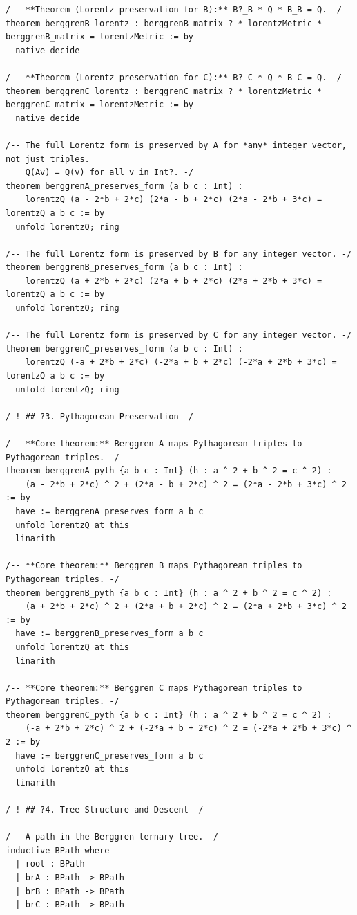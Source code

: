 \documentclass[11pt,twoside,openright]{book}
\theoremstyle{definition}
\theoremstyle{remark}
\begin{document}
\begin{lstlisting}[style=lean]
/-- **Theorem (Lorentz preservation for B):** B?_B * Q * B_B = Q. -/
theorem berggrenB_lorentz : berggrenB_matrix ? * lorentzMetric * berggrenB_matrix = lorentzMetric := by
  native_decide

/-- **Theorem (Lorentz preservation for C):** B?_C * Q * B_C = Q. -/
theorem berggrenC_lorentz : berggrenC_matrix ? * lorentzMetric * berggrenC_matrix = lorentzMetric := by
  native_decide

/-- The full Lorentz form is preserved by A for *any* integer vector, not just triples.
    Q(Av) = Q(v) for all v in Int?. -/
theorem berggrenA_preserves_form (a b c : Int) :
    lorentzQ (a - 2*b + 2*c) (2*a - b + 2*c) (2*a - 2*b + 3*c) = lorentzQ a b c := by
  unfold lorentzQ; ring

/-- The full Lorentz form is preserved by B for any integer vector. -/
theorem berggrenB_preserves_form (a b c : Int) :
    lorentzQ (a + 2*b + 2*c) (2*a + b + 2*c) (2*a + 2*b + 3*c) = lorentzQ a b c := by
  unfold lorentzQ; ring

/-- The full Lorentz form is preserved by C for any integer vector. -/
theorem berggrenC_preserves_form (a b c : Int) :
    lorentzQ (-a + 2*b + 2*c) (-2*a + b + 2*c) (-2*a + 2*b + 3*c) = lorentzQ a b c := by
  unfold lorentzQ; ring

/-! ## ?3. Pythagorean Preservation -/

/-- **Core theorem:** Berggren A maps Pythagorean triples to Pythagorean triples. -/
theorem berggrenA_pyth {a b c : Int} (h : a ^ 2 + b ^ 2 = c ^ 2) :
    (a - 2*b + 2*c) ^ 2 + (2*a - b + 2*c) ^ 2 = (2*a - 2*b + 3*c) ^ 2 := by
  have := berggrenA_preserves_form a b c
  unfold lorentzQ at this
  linarith

/-- **Core theorem:** Berggren B maps Pythagorean triples to Pythagorean triples. -/
theorem berggrenB_pyth {a b c : Int} (h : a ^ 2 + b ^ 2 = c ^ 2) :
    (a + 2*b + 2*c) ^ 2 + (2*a + b + 2*c) ^ 2 = (2*a + 2*b + 3*c) ^ 2 := by
  have := berggrenB_preserves_form a b c
  unfold lorentzQ at this
  linarith

/-- **Core theorem:** Berggren C maps Pythagorean triples to Pythagorean triples. -/
theorem berggrenC_pyth {a b c : Int} (h : a ^ 2 + b ^ 2 = c ^ 2) :
    (-a + 2*b + 2*c) ^ 2 + (-2*a + b + 2*c) ^ 2 = (-2*a + 2*b + 3*c) ^ 2 := by
  have := berggrenC_preserves_form a b c
  unfold lorentzQ at this
  linarith

/-! ## ?4. Tree Structure and Descent -/

/-- A path in the Berggren ternary tree. -/
inductive BPath where
  | root : BPath
  | brA : BPath -> BPath
  | brB : BPath -> BPath
  | brC : BPath -> BPath


\end{lstlisting}
\end{document}

